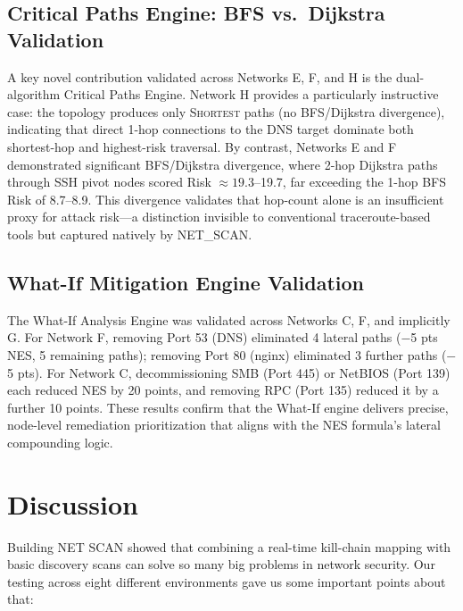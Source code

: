 \documentclass[conference]{IEEEtran}
\begin{document}
\subsection{Critical Paths Engine: BFS vs.\ Dijkstra Validation}
A key novel contribution validated across Networks E, F, and H is the dual-algorithm Critical Paths Engine. Network H provides a particularly instructive case: the topology produces only \textsc{Shortest} paths (no BFS/Dijkstra divergence), indicating that direct 1-hop connections to the DNS target dominate both shortest-hop and highest-risk traversal. By contrast, Networks E and F demonstrated significant BFS/Dijkstra divergence, where 2-hop Dijkstra paths through SSH pivot nodes scored Risk $\approx 19.3$--19.7, far exceeding the 1-hop BFS Risk of 8.7--8.9. This divergence validates that hop-count alone is an insufficient proxy for attack risk---a distinction invisible to conventional traceroute-based tools but captured natively by NET\_SCAN.

\subsection{What-If Mitigation Engine Validation}
The What-If Analysis Engine was validated across Networks C, F, and implicitly G. For Network F, removing Port 53 (DNS) eliminated 4 lateral paths ($-$5 pts NES, 5 remaining paths); removing Port 80 (nginx) eliminated 3 further paths ($-$5 pts). For Network C, decommissioning SMB (Port 445) or NetBIOS (Port 139) each reduced NES by 20 points, and removing RPC (Port 135) reduced it by a further 10 points. These results confirm that the What-If engine delivers precise, node-level remediation prioritization that aligns with the NES formula's lateral compounding logic.

\section{Discussion}
Building NET SCAN showed that combining a real-time kill-chain mapping with basic discovery scans can solve so many big problems in network security. Our testing across eight different environments gave us some important points about that:
\end{document}

